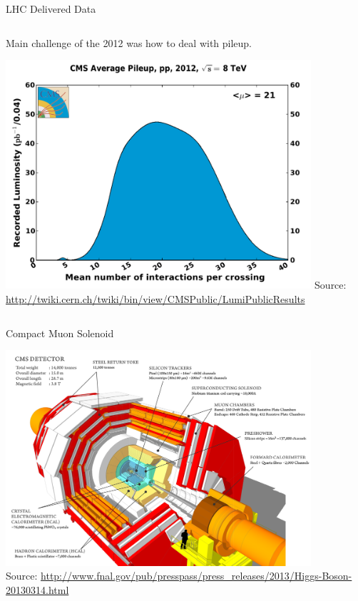 \begin{frame}{LHC Delivered Data}
\begin{columns}
\begin{column}{0.5\textwidth}
\begin{itemize}
Main challenge of the 2012 was how to deal with pileup.
\end{itemize}
\begin{center}
\includegraphics[width=0.85\textwidth]{images/pileup_pp_2012.pdf}
{\fontsize{.1cm}{.001em}\selectfont Source: \url{http://twiki.cern.ch/twiki/bin/view/CMSPublic/LumiPublicResults}}
\end{center}
\end{column}
\end{columns}

\end{frame}

\begin{frame}{Compact Muon Solenoid}
\begin{center}
\includegraphics[width=0.85\textwidth]{images/cms_120918_03.png}\\
{\fontsize{.1cm}{.001em}\selectfont Source: \url{http://www.fnal.gov/pub/presspass/press_releases/2013/Higgs-Boson-20130314.html}}

\end{center}
\end{frame}


